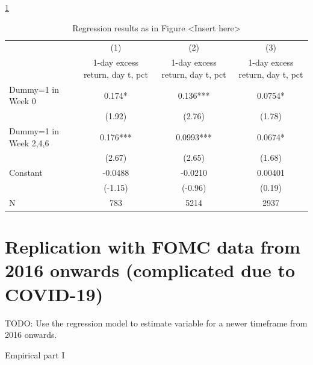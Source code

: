 {
\ref{table_cies19_1}
\begin{table}
\begin{center}
\begin{adjustbox}{width=1\textwidth}
\def\sym#1{\ifmmode^{#1}\else\(^{#1}\)\fi}
\begin{tabular}{l*{3}{c}}

\hline\hline
                    &\multicolumn{1}{c}{(1)}&\multicolumn{1}{c}{(2)}&\multicolumn{1}{c}{(3)}\\
                    &\multicolumn{1}{c}{1-day excess return, day t, pct}&\multicolumn{1}{c}{1-day excess return, day t, pct}&\multicolumn{1}{c}{1-day excess return, day t, pct}\\
\hline
Dummy=1 in Week 0   &       0.174*  &       0.136***&      0.0754*  \\
                    &      (1.92)   &      (2.76)   &      (1.78)   \\
Dummy=1 in Week 2,4,6&       0.176***&      0.0993***&      0.0674*  \\
                    &      (2.67)   &      (2.65)   &      (1.68)   \\
Constant            &     -0.0488   &     -0.0210   &     0.00401   \\
                    &     (-1.15)   &     (-0.96)   &      (0.19)   \\
\hline
N                   &         783   &        5214   &        2937   \\
\hline\hline

\end{tabular}
\end{adjustbox}
\caption{\label{table_cies19_1} Regression results as in Figure <Insert here> \parencite{cieslak_stock_2019}}
\end{center}
\end{table}
}


\newpage



\section{Replication with FOMC data from 2016 onwards (complicated due to COVID-19)}

TODO: Use the regression model to estimate variable for a newer timeframe from 2016 onwards.

Empirical part I

